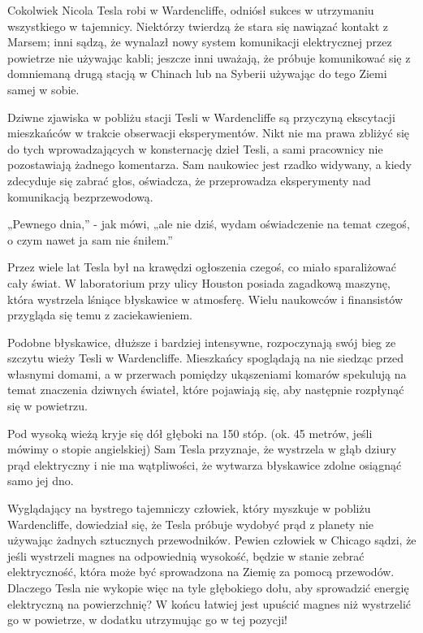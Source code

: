 \documentclass{article}
\begin{document}
\begin{large}
Cokolwiek Nicola Tesla robi w Wardencliffe, odniósł sukces w utrzymaniu wszystkiego w tajemnicy. Niektórzy twierdzą że stara się nawiązać kontakt z Marsem; inni sądzą, że wynalazł nowy system komunikacji elektrycznej przez powietrze nie używając kabli; jeszcze inni uważają, że próbuje komunikować się z domniemaną drugą stacją w Chinach lub na Syberii używając do tego Ziemi samej w sobie.

Dziwne zjawiska w pobliżu stacji Tesli w Wardencliffe są przyczyną ekscytacji mieszkańców w trakcie obserwacji eksperymentów. Nikt nie ma prawa zbliżyć się do tych wprowadzających w konsternację dzieł Tesli, a sami pracownicy nie pozostawiają żadnego komentarza. Sam naukowiec jest rzadko widywany, a kiedy zdecyduje się zabrać głos, oświadcza, że przeprowadza eksperymenty nad komunikacją bezprzewodową.

„Pewnego dnia,” - jak mówi, „ale nie dziś, wydam oświadczenie na temat czegoś, o czym nawet ja sam nie śniłem.”

Przez wiele lat Tesla był na krawędzi ogłoszenia czegoś, co miało sparaliżować cały świat. W laboratorium przy ulicy Houston posiada zagadkową maszynę, która wystrzela lśniące błyskawice w atmosferę. Wielu naukowców i finansistów przygląda się temu z zaciekawieniem.

Podobne błyskawice, dłuższe i bardziej intensywne, rozpoczynają swój bieg ze szczytu wieży Tesli w Wardencliffe. Mieszkańcy spoglądają na nie siedząc przed własnymi domami, a w przerwach pomiędzy ukąszeniami komarów spekulują na temat znaczenia dziwnych świateł, które pojawiają się, aby następnie rozpłynąć się w powietrzu.

Pod wysoką wieżą kryje się dół głęboki na 150 stóp. (ok. 45 metrów, jeśli mówimy o stopie angielskiej) Sam Tesla przyznaje, że wystrzela w głąb dziury prąd elektryczny i nie ma wątpliwości, że wytwarza błyskawice zdolne osiągnąć samo jej dno.

Wyglądający na bystrego tajemniczy człowiek, który myszkuje w pobliżu Wardencliffe, dowiedział się, że Tesla próbuje wydobyć prąd z planety nie używając żadnych sztucznych przewodników. Pewien człowiek w Chicago sądzi, że jeśli wystrzeli magnes na odpowiednią wysokość, będzie w stanie zebrać elektryczność, która może być sprowadzona na Ziemię za pomocą przewodów. Dlaczego Tesla nie wykopie więc na tyle głębokiego dołu, aby sprowadzić energię elektryczną na powierzchnię? W końcu łatwiej jest upuścić magnes niż wystrzelić go w powietrze, w dodatku utrzymując go w tej pozycji!


\end{large}
\end{document}
